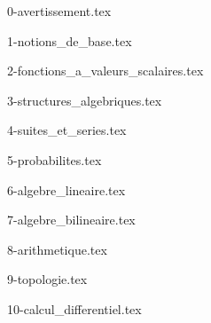 \documentclass{def_classe}
\begin{document}
\maketitle

\tableofcontents

\newpage

{0-avertissement.tex}

{1-notions_de_base.tex}

{2-fonctions_a_valeurs_scalaires.tex}

{3-structures_algebriques.tex}

{4-suites_et_series.tex}

{5-probabilites.tex}

{6-algebre_lineaire.tex}

{7-algebre_bilineaire.tex}

{8-arithmetique.tex}

{9-topologie.tex}

{10-calcul_differentiel.tex}
\end{document}
